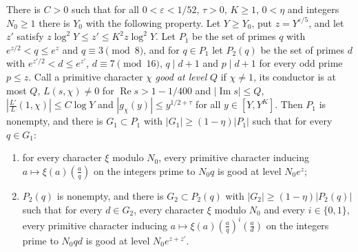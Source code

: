 \begin{lemma}\label{hf-most-primes-good}
There is $C>0$ such that for all $0<\varepsilon<1/52$, $\tau>0$, $K\geq1$, $0<\eta$ and integers
$N_0\geq1$ there is $Y_0$ with the following property. Let $Y\geq Y_0$, put $z=Y^{\varepsilon/5}$,
and let $z'$ satisfy $z\log^2Y\leq z'\leq K^2z\log^2Y$. Let $P_1$ be the set of primes $q$ with
$e^{z/2}<q\leq e^z$ and $q\equiv3\pmod8$, and for $q\in P_1$ let $P_2(q)$ be the set of primes $d$
with $e^{z'/2}<d\leq e^{z'}$, $d\equiv7\pmod{16}$, $q\mid d+1$ and $p\mid d+1$ for every odd prime
$p\leq z$. Call a primitive character $\chi$ \emph{good at level} $Q$ if $\chi\neq1$, its conductor is
at most $Q$, $L(s,\chi)\neq0$ for $\operatorname{Re}s>1-1/400$ and $|\operatorname{Im}s|\leq Q$,
$\left|\frac{L'}{L}(1,\chi)\right|\leq C\log Y$ and $|g_\chi(y)|\leq y^{1/2+\tau}$ for all
$y\in[Y,Y^K]$. Then $P_1$ is nonempty, and there is $G_1\subset P_1$ with $|G_1|\geq(1-\eta)|P_1|$
such that for every $q\in G_1$:
\begin{enumerate}
\item for every character $\xi$ modulo $N_0$, every primitive character inducing
  $a\mapsto\xi(a)\left(\frac aq\right)$ on the integers prime to $N_0q$ is good at level $N_0e^{z}$;
\item $P_2(q)$ is nonempty, and there is $G_2\subset P_2(q)$ with $|G_2|\geq(1-\eta)|P_2(q)|$ such
  that for every $d\in G_2$, every character $\xi$ modulo $N_0$ and every $i\in\{0,1\}$, every
  primitive character inducing $a\mapsto\xi(a)\left(\frac aq\right)^i\left(\frac ad\right)$ on the
  integers prime to $N_0qd$ is good at level $N_0e^{z+z'}$.
\end{enumerate}
\end{lemma}

